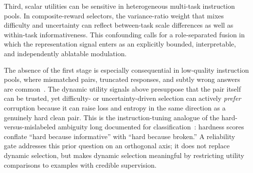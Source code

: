 Third, scalar utilities can be sensitive in heterogeneous multi-task
instruction pools. In composite-reward selectors, the variance-ratio
weight that mixes difficulty and uncertainty can reflect between-task
scale differences as well as within-task informativeness. This
confounding calls for a role-separated fusion in which the
representation signal enters as an explicitly bounded, interpretable,
and independently ablatable modulation.

The absence of the first stage is especially consequential in
low-quality instruction pools, where mismatched pairs, truncated
responses, and subtly wrong answers are
common~\cite{honovich2023unnatural,alpagasus}. The dynamic
utility signals above presuppose that the pair itself can be trusted,
yet difficulty- or uncertainty-driven selection can actively
\emph{prefer} corruption because it can raise loss and entropy in the
same direction as a genuinely hard clean pair. This is the
instruction-tuning analogue of the hard-versus-mislabeled ambiguity
long documented for
classification~\cite{pleiss2020aum,swayamdipta2020cartography,rholoss2022}:
hardness scores conflate ``hard because informative'' with ``hard
because broken.'' A reliability gate addresses this prior question
on an orthogonal axis; it does not replace dynamic selection, but
makes dynamic selection meaningful by restricting utility
comparisons to examples with credible supervision.

